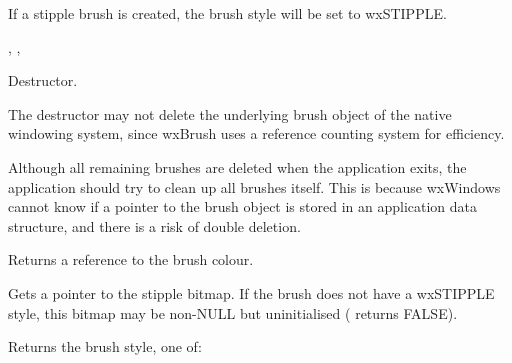 If a stipple brush is created, the brush style will be set to wxSTIPPLE.


, , 



Destructor.


The destructor may not delete the underlying brush object of the native windowing
system, since wxBrush uses a reference counting system for efficiency.

Although all remaining brushes are deleted when the application exits,
the application should try to clean up all brushes itself. This is because
wxWindows cannot know if a pointer to the brush object is stored in an
application data structure, and there is a risk of double deletion.

\label{wxbrushgetcolour}


Returns a reference to the brush colour.



\label{wxbrushgetstipple}


Gets a pointer to the stipple bitmap. If the brush does not have a wxSTIPPLE style,
this bitmap may be non-NULL but uninitialised ( returns FALSE).



\label{wxbrushgetstyle}


Returns the brush style, one of:

\begin{twocollist}\itemsep=0pt
\end{twocollist}

